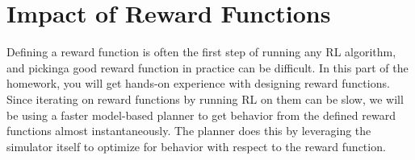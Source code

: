 \section{Impact of Reward Functions}

Defining a reward function is often the first step of running any RL algorithm, and pickinga good reward function in practice can be difficult. 
In this part of the homework, you will get hands-on experience with designing reward functions. 
Since iterating on reward functions by running RL on them can be slow, we will be using a faster model-based planner to get behavior from the defined 
reward functions almost instantaneously. The planner does this by leveraging the simulator itself to optimize for behavior with respect to the reward function.


\begin{enumerate}[(a)]

  

  

\end{enumerate}



